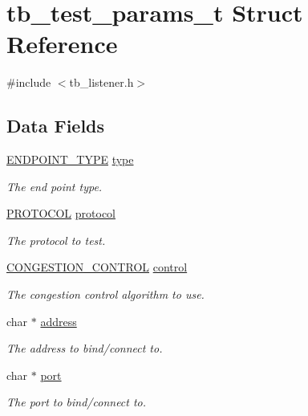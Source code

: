 \hypertarget{structtb__test__params__t}{\section{tb\-\_\-test\-\_\-params\-\_\-t Struct Reference}
\label{structtb__test__params__t}
}


{\ttfamily \#include $<$tb\-\_\-listener.\-h$>$}

\subsection*{Data Fields}
\begin{DoxyCompactItemize}
\item 
\hyperlink{tb__listener_8h_ae37f3ebcf0081b2dd11adf41f1f867d6}{E\-N\-D\-P\-O\-I\-N\-T\-\_\-\-T\-Y\-P\-E} \hyperlink{structtb__test__params__t_a3fefae1824d77098e05df5bac09c1791}{type}
\begin{DoxyCompactList}\small\item\em The end point type. \end{DoxyCompactList}\item 
\hyperlink{tb__protocol_8h_a7a5bff1040fc154c510874327d44cc1a}{P\-R\-O\-T\-O\-C\-O\-L} \hyperlink{structtb__test__params__t_a0d2276cd987e688180eedab183cd503e}{protocol}
\begin{DoxyCompactList}\small\item\em The protocol to test. \end{DoxyCompactList}\item 
\hyperlink{tb__protocol_8h_ac5355051296d54a114b8691ccfc4010c}{C\-O\-N\-G\-E\-S\-T\-I\-O\-N\-\_\-\-C\-O\-N\-T\-R\-O\-L} \hyperlink{structtb__test__params__t_a50b4d1da7c10bfd1e9365a1c37d09442}{control}
\begin{DoxyCompactList}\small\item\em The congestion control algorithm to use. \end{DoxyCompactList}\item 
char $\ast$ \hyperlink{structtb__test__params__t_a879a8cdf605d02f8af8b2e216b8764f2}{address}
\begin{DoxyCompactList}\small\item\em The address to bind/connect to. \end{DoxyCompactList}\item 
char $\ast$ \hyperlink{structtb__test__params__t_add99ba4ea70b8f66170823cad9a55fa4}{port}
\begin{DoxyCompactList}\small\item\em The port to bind/connect to. \end{DoxyCompactList}\item 

\end{DoxyCompactItemize}
